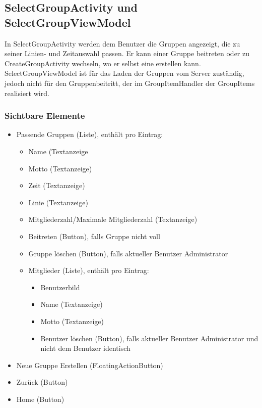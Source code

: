 \documentclass[a4paper]{scrreprt}
\begin{document}
\subsection{SelectGroupActivity und SelectGroupViewModel}
In SelectGroupActivity werden dem Benutzer die Gruppen angezeigt, die zu seiner Linien- und Zeitauswahl passen. Er kann einer Gruppe beitreten oder zu CreateGroupActivity wechseln, wo er selbst eine erstellen kann. SelectGroupViewModel ist für das Laden der Gruppen vom Server zuständig, jedoch nicht für den Gruppenbeitritt, der im GroupItemHandler der GroupItems realisiert wird.

\subsubsection{Sichtbare Elemente}
\begin{itemize}
\item Passende Gruppen (Liste), enthält pro Eintrag:

\begin{itemize}
\item Name (Textanzeige
\item Motto (Textanzeige)
\item Zeit (Textanzeige)
\item Linie (Textanzeige)
\item Mitgliederzahl/Maximale Mitgliederzahl (Textanzeige)
\item Beitreten (Button), falls Gruppe nicht voll
\item Gruppe löschen (Button), falls aktueller Benutzer Administrator
\item Mitglieder (Liste), enthält pro Eintrag:

\begin{itemize}
\item Benutzerbild
\item Name (Textanzeige)
\item Motto (Textanzeige)
\item Benutzer löschen (Button), falls aktueller Benutzer Administrator und nicht dem Benutzer identisch
\end{itemize}
\end{itemize}

\item Neue Gruppe Erstellen (FloatingActionButton)
\item Zurück (Button)
\item Home (Button)
\end{itemize}
\end{document}
